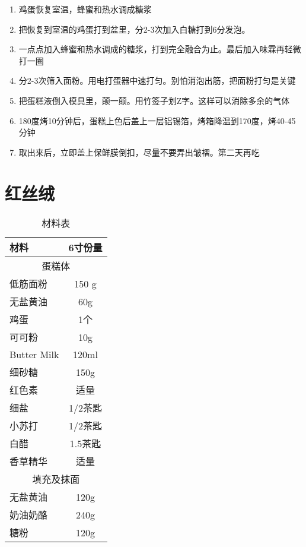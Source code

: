 \begin{enumerate}
    \item 鸡蛋恢复室温，蜂蜜和热水调成糖浆
    \item 把恢复到室温的鸡蛋打到盆里，分2-3次加入白糖打到6分发泡。
    \item 一点点加入蜂蜜和热水调成的糖浆，打到完全融合为止。最后加入味霖再轻微打一圈
    \item 分2-3次筛入面粉。用电打蛋器中速打匀。别怕消泡出筋，把面粉打匀是关键
    \item 把蛋糕液倒入模具里，颠一颠。用竹签子划Z字。这样可以消除多余的气体
    \item 180度烤10分钟后，蛋糕上色后盖上一层铝锡箔，烤箱降温到170度，烤40-45分钟
    \item 取出来后，立即盖上保鲜膜倒扣，尽量不要弄出皱褶。第二天再吃
\end{enumerate}



\section{红丝绒}

\begin{table}[h]
    \centering
    \begin{tabular}{|l||c|}\hline
     \textbf{材料}    &  \textbf{6寸份量}\\ \hline\hline
    \multicolumn{2}{|c|}{蛋糕体}\\ \hline
    低筋面粉     &  150 g \\ \hline
    无盐黄油     &  60g \\ \hline
    鸡蛋  & 1个  \\ \hline
    可可粉 &  10g  \\ \hline
    Butter Milk     &  120ml \\ \hline
    细砂糖     & 150g  \\ \hline
    红色素     & 适量  \\ \hline
    细盐     & 1/2茶匙  \\ \hline
    小苏打     & 1/2茶匙  \\ \hline
    白醋     & 1.5茶匙  \\ \hline
    香草精华     & 适量 \\ \hline
    \multicolumn{2}{|c|}{填充及抹面}\\ \hline
    无盐黄油     &  120g \\ \hline
    奶油奶酪     &  240g \\ \hline
    糖粉     &  120g \\ \hline
    \end{tabular}
    \caption{材料表}
\end{table}

